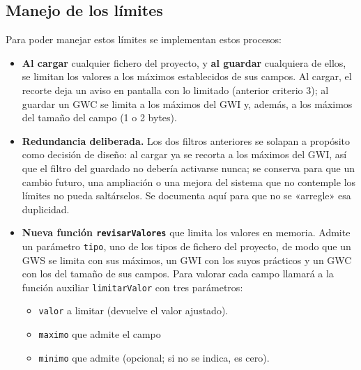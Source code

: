 \subsection{Manejo de los límites}
\label{sec:F5I16Manejo}

Para poder manejar estos límites se implementan estos procesos:

\begin{itemize}
	\item \textbf{Al cargar} cualquier fichero del proyecto, y \textbf{al guardar} cualquiera de ellos, se limitan los valores a los máximos establecidos de sus campos. Al cargar, el recorte deja un aviso en pantalla con lo limitado (anterior criterio 3); al guardar un GWC se limita a los máximos del GWI y, además, a los máximos del tamaño del campo (1 o 2 bytes).
	
	\item \textbf{Redundancia deliberada.} Los dos filtros anteriores se solapan a propósito como decisión de diseño: al cargar ya se recorta a los máximos del GWI, así que el filtro del guardado no debería activarse nunca; se conserva para que un cambio futuro, una ampliación o una mejora del sistema que no contemple los límites no pueda saltárselos. Se documenta aquí para que no se «arregle» esa duplicidad.
	
	\item \textbf{Nueva función \texttt{revisarValores}} que limita los valores en memoria. Admite un parámetro \texttt{tipo}, uno de los tipos de fichero del proyecto, de modo que un GWS se limita con sus máximos, un GWI con los suyos prácticos y un GWC con los del tamaño de sus campos. Para valorar cada campo llamará a la función auxiliar \texttt{limitarValor} con tres parámetros:
	\begin{itemize}
		\item \texttt{valor} a limitar (devuelve el valor ajustado).
		\item \texttt{maximo} que admite el campo
		\item \texttt{minimo} que admite (opcional; si no se indica, es cero).
	\end{itemize}
	

\end{itemize}

